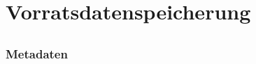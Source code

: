 \documentclass[12pt]{beamer}
\begin{document}
\section{Vorratsdatenspeicherung}
\subsection{}

\begin{frame}
  \frametitle{Metadaten}
\end{frame}
\end{document}
